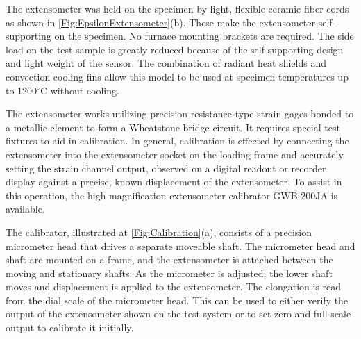 The extensometer was held on the specimen by light, flexible ceramic fiber cords as shown in \ref{Fig:EpsilonExtensometer}(b).
These make the extensometer self-supporting on the specimen.
No furnace mounting brackets are required.
The side load on the test sample is greatly reduced because of the self-supporting design and light weight of the sensor.
The combination of radiant heat shields and convection cooling fins allow this model to be used at specimen temperatures up to 1200$^{\circ}$C without cooling.

The extensometer works utilizing precision resistance-type strain gages bonded to a metallic element to form a Wheatstone bridge circuit.
It requires special test fixtures to aid in calibration.
In general, calibration is effected by connecting the extensometer into the extensometer socket on the loading frame and accurately setting the strain channel output, observed on a digital readout or recorder display against a precise, known displacement of the extensometer.
To assist in this operation, the high magnification extensometer calibrator GWB-200JA is available.

The calibrator, illustrated at \ref{Fig:Calibration}(a), consists of a precision micrometer head that drives a separate moveable shaft.
The micrometer head and shaft are mounted on a frame, and the extensometer is attached between the moving and stationary shafts.
As the micrometer is adjusted, the lower shaft moves and displacement is applied to the extensometer.
The elongation is read from the dial scale of the micrometer head. This can be used to either verify the output of the extensometer shown on the test system or to set zero and full-scale output to calibrate it initially.



